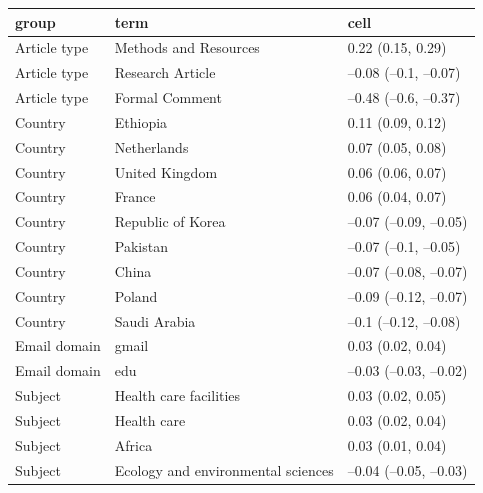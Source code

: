 \begin{table}[ht]
\centering
\begin{tabular}{lll}
 group & term & cell \\ 
  \hline
Article type & Methods and
Resources & 0.22 (0.15, 0.29) \\ 
  Article type & Research Article & --0.08 (--0.1, --0.07) \\ 
  Article type & Formal Comment & --0.48 (--0.6, --0.37) \\ 
  Country & Ethiopia & 0.11 (0.09, 0.12) \\ 
  Country & Netherlands & 0.07 (0.05, 0.08) \\ 
  Country & United Kingdom & 0.06 (0.06, 0.07) \\ 
  Country & France & 0.06 (0.04, 0.07) \\ 
  Country & Republic of Korea & --0.07 (--0.09, --0.05) \\ 
  Country & Pakistan & --0.07 (--0.1, --0.05) \\ 
  Country & China & --0.07 (--0.08, --0.07) \\ 
  Country & Poland & --0.09 (--0.12, --0.07) \\ 
  Country & Saudi Arabia & --0.1 (--0.12, --0.08) \\ 
  Email domain & gmail & 0.03 (0.02, 0.04) \\ 
  Email domain & edu & --0.03 (--0.03, --0.02) \\ 
  Subject & Health care facilities & 0.03 (0.02, 0.05) \\ 
  Subject & Health care & 0.03 (0.02, 0.04) \\ 
  Subject & Africa & 0.03 (0.01, 0.04) \\ 
  Subject & Ecology and
environmental sciences & --0.04 (--0.05, --0.03) \\ 
  \end{tabular}
\end{table}
